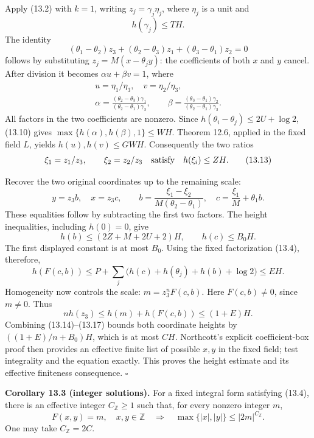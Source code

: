 \documentclass[
  11pt,
  a4paper,
]{article}
\begin{document}
Apply (13.2) with \(k=1\), writing \(z_j=\gamma_j\eta_j\), where
\(\eta_j\) is a unit and \[
h(\gamma_j)\le TH.
\tag{13.10}
\] The identity \[
(\theta_1-\theta_2)z_3+
(\theta_2-\theta_3)z_1+
(\theta_3-\theta_1)z_2=0
\tag{13.11}
\] follows by substituting \(z_j=M(x-\theta_jy)\): the coefficients of
both \(x\) and \(y\) cancel. After division it becomes
\(\alpha u+\beta v=1\), where \[
\begin{gathered}
u=\eta_1/\eta_3,\quad v=\eta_2/\eta_3,\\
\alpha=\frac{(\theta_2-\theta_3)\gamma_1}
              {(\theta_2-\theta_1)\gamma_3},\qquad
\beta=\frac{(\theta_3-\theta_1)\gamma_2}
             {(\theta_2-\theta_1)\gamma_3}.
\end{gathered}
\tag{13.12}
\] All factors in the two coefficients are nonzero. Since
\(h(\theta_i-\theta_j)\le2U+\log2\), (13.10) gives
\(\max\{h(\alpha),h(\beta),1\}\le WH\). Theorem 12.6, applied in the
fixed field \(L\), yields \(h(u),h(v)\le GWH\). Consequently the two
ratios \[
\xi_1=z_1/z_3,\qquad \xi_2=z_2/z_3
\quad\hbox{satisfy}\quad h(\xi_i)\le ZH.
\tag{13.13}
\]

Recover the two original coordinates up to the remaining scale: \[
y=z_3 b,\quad x=z_3 c,\qquad
b=\frac{\xi_1-\xi_2}{M(\theta_2-\theta_1)},\quad
c=\frac{\xi_1}{M}+\theta_1b.
\tag{13.14}
\] These equalities follow by subtracting the first two factors. The
height inequalities, including \(h(0)=0\), give \[
h(b)\le(2Z+M+2U+2)H,\qquad h(c)\le B_0H.
\tag{13.15}
\] The first displayed constant is at most \(B_0\). Using the fixed
factorization (13.4), therefore, \[
h(F(c,b))\le
P+\sum_j\bigl(h(c)+h(\theta_j)+h(b)+\log2\bigr)
\le EH.
\tag{13.16}
\] Homogeneity now controls the scale: \(m=z_3^nF(c,b)\). Here
\(F(c,b)\ne0\), since \(m\ne0\). Thus \[
n h(z_3)\le h(m)+h(F(c,b))\le(1+E)H.
\tag{13.17}
\] Combining (13.14)--(13.17) bounds both coordinate heights by
\(((1+E)/n+B_0)H\), which is at most \(CH\). Northcott's explicit
coefficient-box proof then provides an effective finite list of possible
\(x,y\) in the fixed field; test integrality and the equation exactly.
This proves the height estimate and its effective finiteness
consequence. \(\square\)

\textbf{Corollary 13.3 (integer solutions).} For a fixed integral form
satisfying (13.4), there is an effective integer \(C_{\mathbb Z}\ge1\)
such that, for every nonzero integer \(m\), \[
F(x,y)=m,\quad x,y\in\mathbb Z
\quad\Longrightarrow\quad
\max\{|x|,|y|\}\le |2m|^{C_{\mathbb Z}}.
\tag{13.18}
\] One may take \(C_{\mathbb Z}=2C\).
\end{document}
